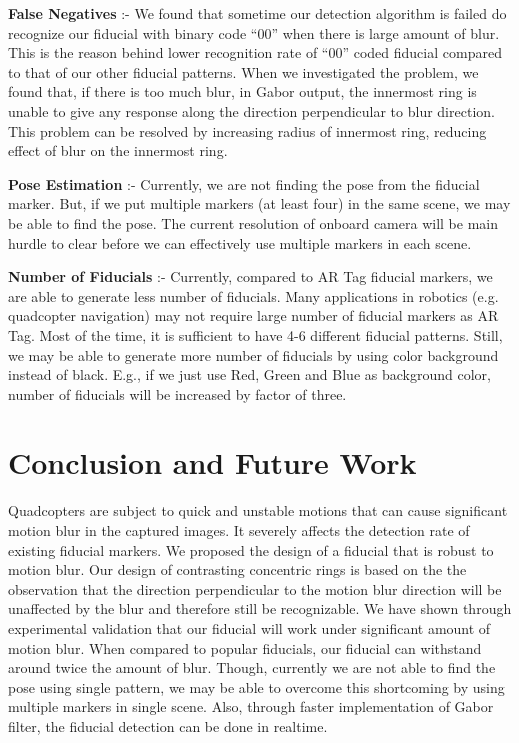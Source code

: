 \documentclass[runningheads]{llncs}
\begin{document}
\noindent\textbf{False Negatives} :- We found that sometime our detection
algorithm is failed do recognize our fiducial with binary code ``00'' when there is large
amount of blur. This is the reason behind lower recognition rate of ``00''
coded fiducial compared to that of our other fiducial patterns. When we
investigated the problem, we found that, if there is too much blur, in Gabor
output, the innermost ring is unable to give any response along the direction
perpendicular to blur direction. This problem can be resolved by increasing
radius of innermost ring, reducing effect of blur on the innermost ring.

\noindent\textbf{Pose Estimation} :- Currently, we are not finding the pose from
the fiducial marker. But, if we put multiple markers (at least four) in the same
scene, we may be able to find the pose. The current resolution of onboard camera
will be main hurdle to clear before we can effectively use multiple markers in
each scene.

\noindent\textbf{Number of Fiducials} :- Currently, compared to AR Tag fiducial
markers, we are able to generate less number of fiducials. Many applications in
robotics (e.g. quadcopter navigation) may not require large number of fiducial
markers as AR Tag. Most of the time, it is sufficient to have 4-6
different fiducial patterns. Still, we may be able to generate more number of
fiducials by using color background instead of black. E.g., if we just use Red,
Green and Blue as background color, number of fiducials will be increased by
factor of three.

\section{Conclusion and Future Work}
Quadcopters are subject to quick and unstable motions that can cause significant
motion blur in the captured images. It severely affects the detection rate of
existing fiducial markers. We proposed the design of a fiducial that is robust
to motion blur. Our design of contrasting concentric rings is based on the the
observation that the direction perpendicular to the motion blur direction will
be unaffected by the blur and therefore still be recognizable. We have shown
through experimental validation that our fiducial will work under significant
amount of motion blur. When compared to popular fiducials, our fiducial can
withstand around twice the amount of blur.  Though, currently we are not able to
find the pose using single pattern, we may be able to overcome this
shortcoming by using multiple markers in single scene. Also, through faster
implementation of Gabor filter, the fiducial detection can be done in realtime.



\end{document}
